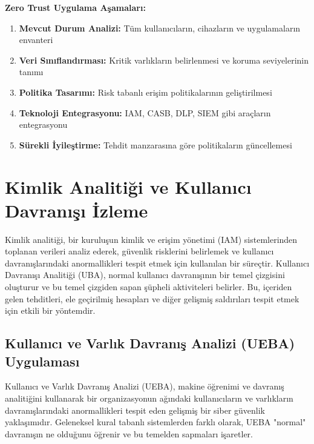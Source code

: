 \textbf{Zero Trust Uygulama Aşamaları:}

\begin{enumerate}
    \item \textbf{Mevcut Durum Analizi:} Tüm kullanıcıların, cihazların ve uygulamaların envanteri
    \item \textbf{Veri Sınıflandırması:} Kritik varlıkların belirlenmesi ve koruma seviyelerinin tanımı
    \item \textbf{Politika Tasarımı:} Risk tabanlı erişim politikalarının geliştirilmesi
    \item \textbf{Teknoloji Entegrasyonu:} IAM, CASB, DLP, SIEM gibi araçların entegrasyonu
    \item \textbf{Sürekli İyileştirme:} Tehdit manzarasına göre politikaların güncellemesi
\end{enumerate}

\section{Kimlik Analitiği ve Kullanıcı Davranışı İzleme}
Kimlik analitiği, bir kuruluşun kimlik ve erişim yönetimi (IAM) sistemlerinden toplanan verileri analiz ederek, güvenlik risklerini belirlemek ve kullanıcı davranışlarındaki anormallikleri tespit etmek için kullanılan bir süreçtir. Kullanıcı Davranışı Analitiği (UBA), normal kullanıcı davranışının bir temel çizgisini oluşturur ve bu temel çizgiden sapan şüpheli aktiviteleri belirler. Bu, içeriden gelen tehditleri, ele geçirilmiş hesapları ve diğer gelişmiş saldırıları tespit etmek için etkili bir yöntemdir.

\subsection{Kullanıcı ve Varlık Davranış Analizi (UEBA) Uygulaması}

Kullanıcı ve Varlık Davranış Analizi (UEBA), makine öğrenimi ve davranış analitiğini kullanarak bir organizasyonun ağındaki kullanıcıların ve varlıkların davranışlarındaki anormallikleri tespit eden gelişmiş bir siber güvenlik yaklaşımıdır. Geleneksel kural tabanlı sistemlerden farklı olarak, UEBA "normal" davranışın ne olduğunu öğrenir ve bu temelden sapmaları işaretler.

